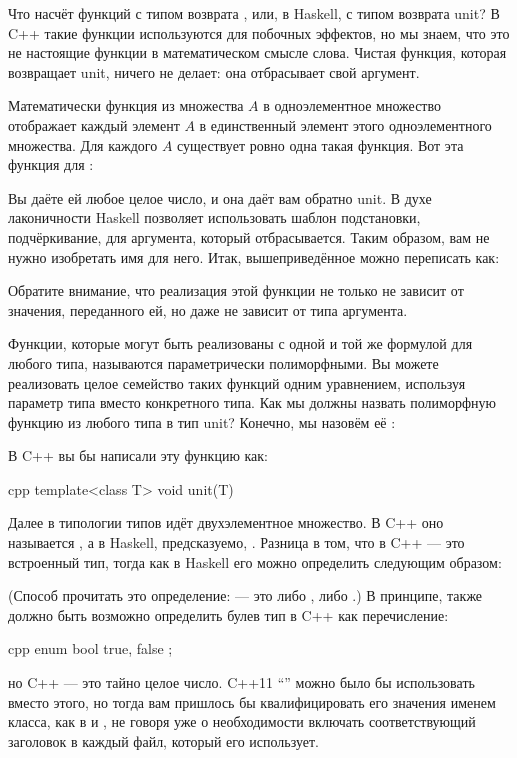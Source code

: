 Что насчёт функций с типом возврата , или, в Haskell,
с типом возврата unit? В C++ такие функции используются для побочных
эффектов, но мы знаем, что это не настоящие функции в
математическом смысле слова. Чистая функция, которая возвращает unit, ничего
не делает: она отбрасывает свой аргумент.

Математически функция из множества $A$ в одноэлементное множество отображает каждый
элемент $A$ в единственный элемент этого одноэлементного множества. Для каждого $A$
существует ровно одна такая функция. Вот эта функция для
:

Вы даёте ей любое целое число, и она даёт вам обратно unit. В духе
лаконичности Haskell позволяет использовать шаблон подстановки, подчёркивание,
для аргумента, который отбрасывается. Таким образом, вам не нужно изобретать
имя для него. Итак, вышеприведённое можно переписать как:

Обратите внимание, что реализация этой функции не только не зависит
от значения, переданного ей, но даже не зависит от типа
аргумента.

Функции, которые могут быть реализованы с одной и той же формулой для любого типа,
называются параметрически полиморфными. Вы можете реализовать целое семейство
таких функций одним уравнением, используя параметр типа вместо
конкретного типа. Как мы должны назвать полиморфную функцию из любого типа
в тип unit? Конечно, мы назовём её :

В C++ вы бы написали эту функцию как:

\begin{snip}{cpp}
template<class T>
void unit(T) {}
\end{snip}
Далее в типологии типов идёт двухэлементное множество. В C++ оно называется
, а в Haskell, предсказуемо, . Разница
в том, что в C++  --- это встроенный тип, тогда как в Haskell его
можно определить следующим образом:

(Способ прочитать это определение:  --- это либо
, либо .) В принципе, также должно быть возможно
определить булев тип в C++ как перечисление:

\begin{snip}{cpp}
enum bool {
    true,
    false
};
\end{snip}
но C++  --- это тайно целое число. C++11
``'' можно было бы использовать вместо этого, но тогда вам
пришлось бы квалифицировать его значения именем класса, как в
 и , не говоря уже о необходимости
включать соответствующий заголовок в каждый файл, который его использует.

